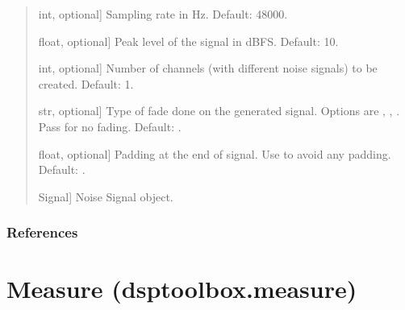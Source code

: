\documentclass[letterpaper,10pt,english]{sphinxmanual}
\begin{document}
\begin{fulllineitems}
\begin{quote}
\begin{description}
\begin{description}
\sphinxlineitem{\sphinxstylestrong{sampling\_rate\_hz}}{[}int, optional{]}
\sphinxAtStartPar
Sampling rate in Hz. Default: 48000.

\sphinxlineitem{\sphinxstylestrong{peak\_level\_dbfs}}{[}float, optional{]}
\sphinxAtStartPar
Peak level of the signal in dBFS. Default: \sphinxhyphen{}10.

\sphinxlineitem{\sphinxstylestrong{number\_of\_channels}}{[}int, optional{]}
\sphinxAtStartPar
Number of channels (with different noise signals) to be created.
Default: 1.

\sphinxlineitem{\sphinxstylestrong{fade}}{[}str, optional{]}
\sphinxAtStartPar
Type of fade done on the generated signal. Options are ,
, . Pass  for no fading. Default: .

\sphinxlineitem{\sphinxstylestrong{padding\_end\_seconds}}{[}float, optional{]}
\sphinxAtStartPar
Padding at the end of signal. Use  to avoid any padding.
Default: .

\end{description}

\begin{description}
\sphinxlineitem{\sphinxstylestrong{noise\_sig}}{[}Signal{]}
\sphinxAtStartPar
Noise Signal object.

\end{description}

\end{description}\end{quote}
\subsubsection*{References}

\sphinxAtStartPar
{}

\end{fulllineitems}


\sphinxstepscope


\section{Measure (dsptoolbox.measure)}
\label{\detokenize{modules/dsptoolbox.measure:module-dsptoolbox.measure}}\label{\detokenize{modules/dsptoolbox.measure:measure-dsptoolbox-measure}}\label{\detokenize{modules/dsptoolbox.measure::doc}}
\end{document}
